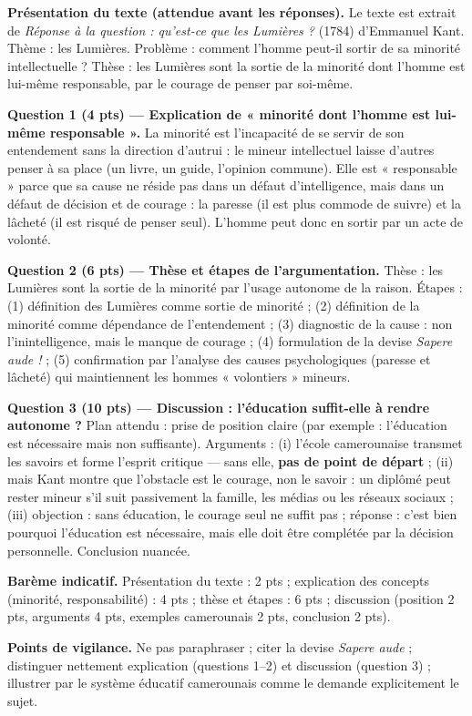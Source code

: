 \documentclass[11pt]{article}
\begin{document}
\begin{corrige}
\textbf{Présentation du texte (attendue avant les réponses).} Le texte est extrait de \emph{Réponse à la question : qu'est-ce que les Lumières ?} (1784) d'Emmanuel Kant. Thème : les Lumières. Problème : comment l'homme peut-il sortir de sa minorité intellectuelle ? Thèse : les Lumières sont la sortie de la minorité dont l'homme est lui-même responsable, par le courage de penser par soi-même.

\textbf{Question 1 (4 pts) — Explication de « minorité dont l'homme est lui-même responsable ».} La minorité est l'incapacité de se servir de son entendement sans la direction d'autrui : le mineur intellectuel laisse d'autres penser à sa place (un livre, un guide, l'opinion commune). Elle est « responsable » parce que sa cause ne réside pas dans un défaut d'intelligence, mais dans un défaut de décision et de courage : la paresse (il est plus commode de suivre) et la lâcheté (il est risqué de penser seul). L'homme peut donc en sortir par un acte de volonté.

\textbf{Question 2 (6 pts) — Thèse et étapes de l'argumentation.} Thèse : les Lumières sont la sortie de la minorité par l'usage autonome de la raison. Étapes : (1) définition des Lumières comme sortie de minorité ; (2) définition de la minorité comme dépendance de l'entendement ; (3) diagnostic de la cause : non l'inintelligence, mais le manque de courage ; (4) formulation de la devise \emph{Sapere aude !} ; (5) confirmation par l'analyse des causes psychologiques (paresse et lâcheté) qui maintiennent les hommes « volontiers » mineurs.

\textbf{Question 3 (10 pts) — Discussion : l'éducation suffit-elle à rendre autonome ?} Plan attendu : prise de position claire (par exemple : l'éducation est nécessaire mais non suffisante). Arguments : (i) l'école camerounaise transmet les savoirs et forme l'esprit critique — sans elle, \textbf{pas de point de départ} ; (ii) mais Kant montre que l'obstacle est le courage, non le savoir : un diplômé peut rester mineur s'il suit passivement la famille, les médias ou les réseaux sociaux ; (iii) objection : sans éducation, le courage seul ne suffit pas ; réponse : c'est bien pourquoi l'éducation est nécessaire, mais elle doit être complétée par la décision personnelle. Conclusion nuancée.

\textbf{Barème indicatif.} Présentation du texte : 2 pts ; explication des concepts (minorité, responsabilité) : 4 pts ; thèse et étapes : 6 pts ; discussion (position 2 pts, arguments 4 pts, exemples camerounais 2 pts, conclusion 2 pts).

\textbf{Points de vigilance.} Ne pas paraphraser ; citer la devise \emph{Sapere aude} ; distinguer nettement explication (questions 1--2) et discussion (question 3) ; illustrer par le système éducatif camerounais comme le demande explicitement le sujet.
\end{corrige}
\end{document}

